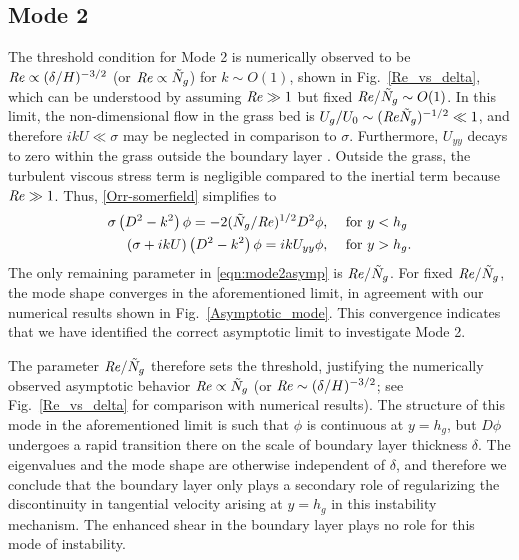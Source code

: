 \documentclass{jfm}
\newcommand{\hg}{h_g}
\newcommand{\Ndg}{\tilde{N}_g}
\begin{document}
\subsection{Mode 2}
The threshold condition for Mode 2 is numerically observed to be $\mbox{\textit{Re}} \propto ({\delta}/{H})^{-3/2}$ (or $\Rey \propto \Ndg$) for $k\sim O(1)$, shown in Fig.~\ref{Re_vs_delta}, which can be understood by assuming $\mbox{\textit{Re}} \gg 1$ but fixed $\Rey/\Ndg \sim O(1)$.
In this limit, the non-dimensional flow in the grass bed is $U_g/U_0 \sim (\Rey \Ndg)^{-1/2} \ll 1$, and therefore $ikU \ll \sigma$ may be neglected in comparison to $\sigma$. 
Furthermore, $U_{yy}$ decays to zero within the grass outside the boundary layer . 
Outside the grass, the turbulent viscous stress term is negligible compared to the inertial term because $\mbox{\textit{Re}} \gg 1$. 
Thus, \eqref{Orr-somerfield} simplifies to 
\begin{subequations}
\begin{align}
\sigma\left(D^2-k^2\right)\phi = -2{(\Ndg/\Rey)^{1/2}}D^2\phi,  \quad &\text{ for } y<\hg  \label{eqn:mode2asympa} \\
\left(\sigma+ikU\right) \left(D^2-k^2\right)\phi =  ikU_{yy}\phi, \quad &\text{ for } y>\hg. \label{eqn:mode2asympb}
\end{align}
\label{eqn:mode2asymp}
\end{subequations}
The only remaining parameter in \eqref{eqn:mode2asymp} is $\Rey/\Ndg$. 
For fixed $\Rey/\Ndg$, the mode shape converges in the aforementioned limit, in agreement with our numerical results shown in Fig.~\ref{Asymptotic_mode}.
This convergence indicates that we have identified the correct asymptotic limit to investigate Mode 2.

The parameter $\Rey/\Ndg$ therefore sets the threshold, justifying the numerically observed asymptotic behavior $\Rey \propto \Ndg$ (or $\mbox{\textit{Re}} \sim ({\delta}/{H})^{-3/2}$; see Fig.~\ref{Re_vs_delta} for comparison with numerical results).
The structure of this mode in the aforementioned limit is such that $\phi$ is continuous at $y=h_g$, but $D\phi$ undergoes a rapid transition there on the scale of boundary layer thickness $\delta$.
The eigenvalues and the mode shape are otherwise independent of $\delta$, and therefore we conclude that the boundary layer only plays a secondary role of regularizing the discontinuity in tangential velocity arising at $y=\hg$ in this instability mechanism.
The enhanced shear in the boundary layer plays no role for this mode of instability.
\end{document}
